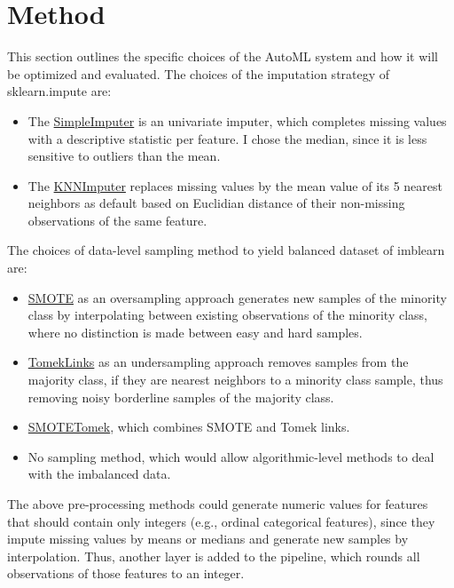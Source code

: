 \documentclass[11pt]{article}
\begin{document}
\section{Method}

This section outlines the specific choices of the AutoML system and how it will be optimized and evaluated. The choices of the imputation strategy of sklearn.impute are:
\begin{itemize}
\item The \href{https://scikit-learn.org/stable/modules/generated/sklearn.impute.SimpleImputer.html}{SimpleImputer} is an univariate imputer, which completes missing values with a descriptive statistic per feature. I chose the median, since it is less sensitive to outliers than the mean.
\item The \href{https://scikit-learn.org/stable/modules/generated/sklearn.impute.KNNImputer.html#sklearn.impute.KNNImputer}{KNNImputer} replaces missing values by the mean value of its 5 nearest neighbors as default based on Euclidian distance of their non-missing observations of the same feature. 
\end{itemize}

The choices of data-level sampling method to yield balanced dataset of imblearn are:
\begin{itemize}
\item \href{https://imbalanced-learn.org/stable/references/generated/imblearn.over_sampling.SMOTE.html}{SMOTE} as an oversampling approach generates new samples of the minority class by interpolating between existing observations of the minority class, where no distinction is made between easy and hard samples. 
\item \href{https://imbalanced-learn.org/stable/references/generated/imblearn.under_sampling.TomekLinks.html}{TomekLinks} as an undersampling approach removes samples from the majority class, if they are nearest neighbors to a minority class sample, thus removing noisy borderline samples of the majority class. 
\item \href{https://imbalanced-learn.org/stable/references/generated/imblearn.combine.SMOTETomek.html}{SMOTETomek}, which combines SMOTE and Tomek links.
\item No sampling method, which would allow algorithmic-level methods to deal with the imbalanced data. 
\end{itemize}

The above pre-processing methods could generate numeric values for features that should contain only integers (e.g., ordinal categorical features), since they impute missing values by means or medians and generate new samples by interpolation. Thus, another layer is added to the pipeline, which rounds all observations of those features to an integer. \\
\end{document}
